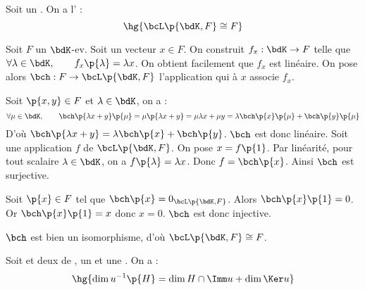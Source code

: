 \documentclass[a4paper,french,bookmarks]{book}
\begin{document}
    \begin{property*}{}{}
        Soit  un . On a l' :
        \[ \hg{\bcL\p{\bdK, F} \cong F}\]
    \end{property*}
    \begin{nproof}
        Soit $F$ un $\bdK$-ev. Soit un vecteur $x \in F$. On construit $f_x : \bdK \to F$ telle que $\forall \lambda \in \bdK,\qquad f_x\p{\lambda} = \lambda x$. On obtient facilement que $f_x$ est linéaire. On pose alors $\bch : F \to \bcL\p{\bdK, F}$ l'application qui à $x$ associe $f_x$.
        \begin{enumerate}
            \itt Soit $\p{x, y} \in F$ et $\lambda \in \bdK$, on a :
            \[ \forall \mu \in \bdK,\qquad \bch\p{\lambda x + y}\p{\mu} = \mu\p{\lambda x + y} = \mu\lambda x + \mu y = \lambda \bch\p{x}\p{\mu} + \bch\p{y}\p{\mu} \]
            D'où $\bch\p{\lambda x + y} = \lambda \bch\p{x} +  \bch\p{y}$. $\bch$ est donc linéaire.
            \itt Soit une application $f$ de $\bcL\p{\bdK, F}$. On pose $x = f\p{1}$. Par linéarité, pour tout scalaire $\lambda \in \bdK$, on a $f\p{\lambda} = \lambda x$. Donc $f = \bch\p{x}$. Ainsi $\bch$ est surjective.
            
            \itt Soit $\p{x} \in F$ tel que $\bch\p{x} = 0_{\bcL\p{\bdK, F}}$. Alors $\bch\p{x}\p{1} = 0$. Or $\bch\p{x}\p{1} = x$ donc $x = 0$. $\bch$ est donc injective.
        \end{enumerate}
        $\bch$ est bien un isomorphisme, d'où $\bcL\p{\bdK, F} \cong F$.
    \end{nproof}
    
    \begin{property*}{}{}
        Soit  et  deux  de ,  un  et  une . On a :
        \[ \hg{\dim{u^{-1}\p{H}} = \dim{H \cap \Imm u} + \dim{\Ker u}}\]
    \end{property*}
    
\end{document}
